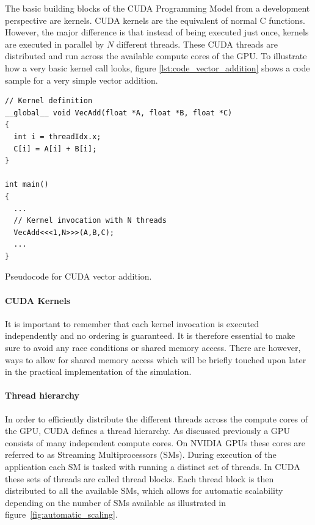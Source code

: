 \documentclass[a4paper,11pt]{kth-mag}
\begin{document}
The basic building blocks of the CUDA Programming Model from a development perspective are kernels. CUDA kernels are the equivalent of normal C functions. However, the major difference is that instead of being executed just once, kernels are executed in parallel by $N$ different threads. These CUDA threads are distributed and run across the available compute cores of the GPU. To illustrate how a very basic kernel call looks, figure \ref{lst:code_vector_addition} shows a code sample for a very simple vector addition.

\begin{listing}[!htbp]
  \centering
  \begin{verbatim}
// Kernel definition
__global__ void VecAdd(float *A, float *B, float *C)
{
  int i = threadIdx.x;
  C[i] = A[i] + B[i];
}

int main()
{
  ...
  // Kernel invocation with N threads
  VecAdd<<<1,N>>>(A,B,C);
  ...
}
  \end{verbatim}
  \caption{Pseudocode for CUDA vector addition.}
  \label{lst:code_vector_addition}
\end{listing}

\paragraph{CUDA Kernels}

It is important to remember that each kernel invocation is executed independently and no ordering is guaranteed. It is therefore essential to make sure to avoid any race conditions or shared memory access. There are however, ways to allow for shared memory access which will be briefly touched upon later in the practical implementation of the simulation.

\paragraph{Thread hierarchy}

In order to efficiently distribute the different threads across the compute cores of the GPU, CUDA defines a thread hierarchy. As discussed previously a GPU consists of many independent compute cores. On NVIDIA GPUs these cores are referred to as Streaming Multiprocessors (SMs). During execution of the application each SM is tasked with running a distinct set of threads. In CUDA these sets of threads are called thread blocks. Each thread block is then distributed to all the available SMs, which allows for automatic scalability depending on the number of SMs available  as illustrated in figure~\ref{fig:automatic_scaling}.
\end{document}
